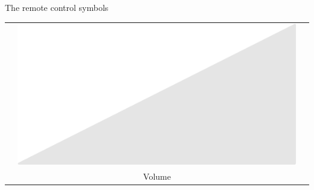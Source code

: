 \documentclass[14pt]{beamer}
\begin{document}
\begin{frame}{The remote control symbols}
\begin{center}
\begin{tabular}{ccc}
                &\quad\includegraphics[scale=0.2]{figures/figure026l.pdf} \quad& \\
                &\quad Volume \quad& \\
            \end{tabular}
        \end{center}
    \end{frame}

\end{document}
